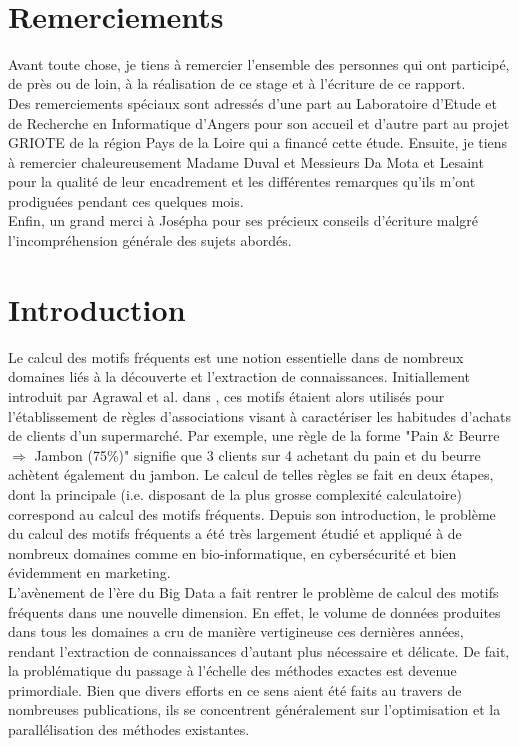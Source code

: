 \documentclass[a4paper,10pt]{report}
\begin{document}
\newpage
~
\newpage
\chapter*{Remerciements}

Avant toute chose, je tiens à remercier l'ensemble des personnes qui ont participé, de près ou de loin, à la réalisation de ce stage et à l'écriture de ce rapport. \\

\hspace{0.2cm}Des remerciements spéciaux sont adressés d'une part au Laboratoire d'Etude et de Recherche en Informatique d'Angers pour son accueil et d'autre part au projet GRIOTE de la région Pays de la Loire qui a financé cette étude. Ensuite, je tiens à remercier chaleureusement Madame Duval et Messieurs Da Mota et Lesaint pour la qualité de leur encadrement et les différentes remarques qu'ils m'ont prodiguées pendant ces quelques mois. \\

\hspace{0.2cm}Enfin, un grand merci à Josépha pour ses précieux conseils d'écriture malgré l'incompréhension générale des sujets abordés.

\tableofcontents
\newpage

\chapter{Introduction}
Le calcul des motifs fréquents est une notion essentielle dans de nombreux domaines liés à la découverte et l'extraction de connaissances. Initiallement introduit par Agrawal et al. dans \cite{AGR93}, ces motifs étaient alors utilisés pour l'établissement de règles d'associations visant à caractériser les habitudes d'achats de clients d'un supermarché. Par exemple, une règle de la forme "Pain \& Beurre $\Rightarrow$ Jambon (75\%)" signifie que 3 clients sur 4 achetant du pain et du beurre achètent également du jambon. Le calcul de telles règles se fait en deux étapes, dont la principale (i.e. disposant de la plus grosse complexité calculatoire) correspond au calcul des motifs fréquents. Depuis son introduction, le problème du calcul des motifs fréquents a été très largement étudié et appliqué à de nombreux domaines comme en bio-informatique, en cybersécurité et bien évidemment en marketing.\\

\hspace{0.15cm}L'avènement de l'ère du Big Data a fait rentrer le problème de calcul des motifs fréquents dans une nouvelle dimension. En effet, le volume de données produites dans tous les domaines a cru de manière vertigineuse ces dernières années, rendant l'extraction de connaissances d'autant plus nécessaire et délicate. De fait, la problématique du passage à l'échelle des méthodes exactes est devenue primordiale. Bien que divers efforts en ce sens aient été faits au travers de nombreuses publications, ils se concentrent généralement sur l'optimisation et la parallélisation des méthodes existantes. \\
\end{document}

